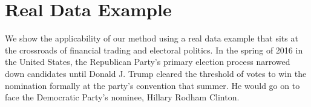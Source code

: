 \documentclass[11pt]{article}
\theoremstyle{definition}
\begin{document}

\clearpage 

\section{Real Data Example}

We show the applicability of our method using a real data example that sits at the crossroads of financial trading and electoral politics.  In the spring of 2016 in the United States, the Republican Party's primary election process narrowed down candidates until Donald J. Trump cleared the threshold of votes to win the nomination formally at the party's convention that summer.  He would go on to face the Democratic Party's nominee, Hillary Rodham Clinton.   
\end{document}
